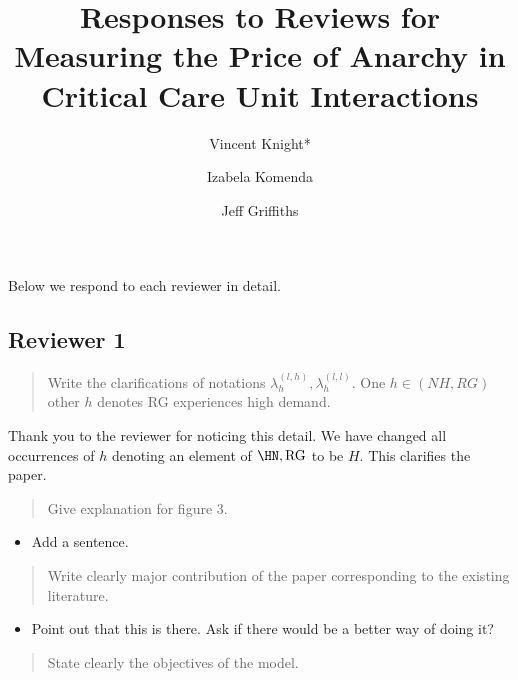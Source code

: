 \documentclass{article}
\title{Responses to Reviews for Measuring the Price of Anarchy in Critical Care Unit Interactions}
\author{Vincent Knight*
    \and
        Izabela Komenda
    \and
        Jeff Griffiths}
\newcommand{\RG}{\text{RG}}
\begin{document}
\maketitle

Below we respond to each reviewer in detail.

\subsection{Reviewer 1}

\begin{quote}
    \begin{textit}{
Write the clarifications of notations \(\lambda_{h}^{(l,h)},\lambda_{h}^{(l,l)}\). One \(h \in (NH,RG)\) other \(h\) denotes RG experiences high demand.
    }\end{textit}
\end{quote}

Thank you to the reviewer for noticing this detail.
We have changed all occurrences of \(h\) denoting an element of \(\HN, \RG\) to
be \(H\). This clarifies the paper.

\begin{quote}
    \begin{textit}{
Give explanation for figure 3.
    }\end{textit}
\end{quote}

\begin{itemize}
    \item Add a sentence.
\end{itemize}

\begin{quote}
    \begin{textit}{
    Write clearly major contribution of the paper corresponding to the existing
    literature.
    }\end{textit}
\end{quote}

\begin{itemize}
    \item Point out that this is there. Ask if there would be a better way of doing it?
\end{itemize}

\begin{quote}
    \begin{textit}{
    State clearly the objectives of the model.
    }\end{textit}
\end{quote}
\end{document}
